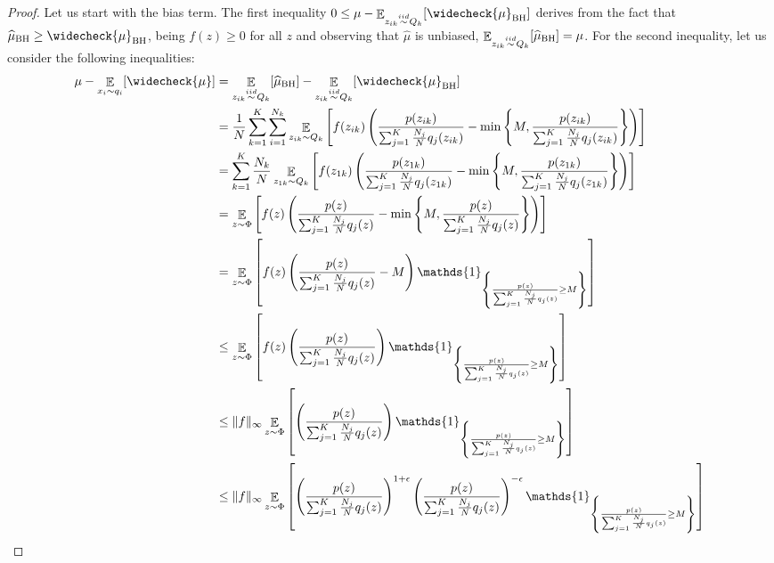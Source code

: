 \documentclass{article}
\begin{document}
\truncatedbias*
\begin{proof}
Let us start with the bias term. The first inequality $0 \le \mu - \Exp_{z_{ik} \simiid Q_k} [\widecheck{\mu}_{\text{BH}}]$ derives from the fact that $\widehat{\mu}_{\text{BH}} \ge \widecheck{\mu}_{\text{BH}}$, being $f(z) \ge 0$ for all $z$ and observing that $\widehat{\mu}$ is unbiased, \ie $\mathop{\mathbb{E}}_{z_{ik} \stackrel{iid}{\sim} Q_k}[\widehat{\mu}_{\text{BH}}]=\mu$. For the second inequality, let us consider the following inequalities:
    \begin{align}
    \mu - \Exp_{x_i \sim q_i} [\widecheck{\mu}]&  = \Exp_{z_{ik} \simiid Q_k}[\widehat{\mu}_{\text{BH}}] - \Exp_{z_{ik} \simiid Q_k} [\widecheck{\mu}_{\text{BH}}] \\
    & =  \frac{1}{N} \sum_{k=1}^K\sum_{i=1}^{N_k} \Exp_{z_{ik} \sim Q_k} \left[  f(z_{ik}) \left( \frac{p(z_{ik})}{\sum_{j=1}^K \frac{N_j}{N} q_j(z_{ik})} - \min \left\{ M,  \frac{p(z_{ik})}{\sum_{j=1}^K \frac{N_j}{N} q_j(z_{ik})} \right\} \right) \right]\\    
    & =   \sum_{k=1}^K \frac{N_k}{N} \Exp_{z_{1k} \sim Q_k} \left[  f(z_{1k}) \left( \frac{p(z_{1k})}{\sum_{j=1}^K \frac{N_j}{N} q_j(z_{1k})} - \min \left\{ M,  \frac{p(z_{1k})}{\sum_{j=1}^K \frac{N_j}{N} q_j(z_{1k})} \right\} \right) \right]\\
     & = \Exp_{z \sim \Phi} \left[  f(z) \left( \frac{p(z)}{\sum_{j=1}^K \frac{N_j}{N} q_j(z)} - \min \left\{ M,  \frac{p(z)}{\sum_{j=1}^K \frac{N_j}{N} q_j(z)} \right\} \right) \right]\\
    & =  \Exp_{z \sim \Phi} \left[  f(z) \left(  \frac{p(z)}{\sum_{j=1}^K \frac{N_j}{N} q_j(z)} - M  \right) \mathds{1}_{\left\{ \frac{p(z)}{\sum_{j=1}^K \frac{N_j}{N} q_j(z)} \ge M \right\} } \right]\\
    & \le \Exp_{z \sim \Phi} \left[  f(z) \left(  \frac{p(z)}{\sum_{j=1}^K \frac{N_j}{N} q_j(z)} \right) \mathds{1}_{\left\{ \frac{p(z)}{\sum_{j=1}^K \frac{N_j}{N} q_j(z)} \ge M \right\} } \right]\\
    & \le \|f\|_{\infty} \Exp_{z \sim \Phi} \left[  \left(  \frac{p(z)}{\sum_{j=1}^K \frac{N_j}{N} q_j(z)} \right) \mathds{1}_{\left\{ \frac{p(z)}{\sum_{j=1}^K \frac{N_j}{N} q_j(z)} \ge M \right\} } \right]\\
    & \le \|f\|_{\infty} \Exp_{z \sim \Phi} \left[  \left(  \frac{p(z)}{\sum_{j=1}^K \frac{N_j}{N} q_j(z)} \right)^{1+\epsilon} \left(  \frac{p(z)}{\sum_{j=1}^K \frac{N_j}{N} q_j(z)} \right)^{-\epsilon} \mathds{1}_{\left\{ \frac{p(z)}{\sum_{j=1}^K \frac{N_j}{N} q_j(z)} \ge M \right\} } \right]\\

\end{align}
\end{proof}
\end{document}
